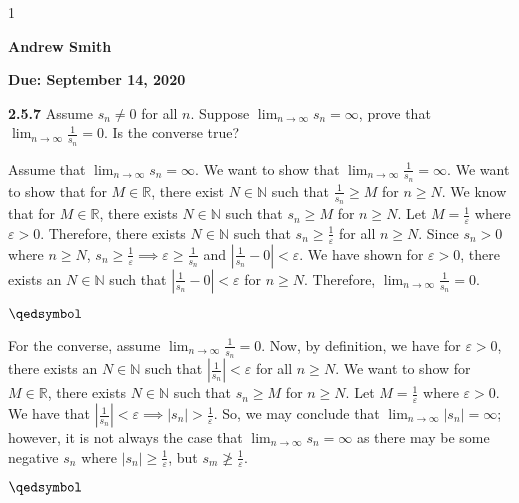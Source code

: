 \documentclass[12pt]{article}
\newcommand{\duedate}{September 14, 2020}
\newcommand{\yourname}{Andrew Smith}
\def\printsolutions{1}
\newcommand{\N}{\mathbb{N}}
\newcommand{\R}{\mathbb{R}}
\begin{document}
\if\printsolutions1
\begin{center}
\textbf{\Large \yourname}
\end{center}
\else
\begin{center}
\textbf{\Large Due: \duedate}
\end{center}
\fi


\begin{problem}\textbf{2.5.7}
Assume $s_n\neq 0$ for all $n$. Suppose ${\lim_{n \to \infty}s_n=\infty}$, prove that ${\lim_{n \to \infty}\frac{1}{s_n}=0}$. Is the converse true?
\end{problem}
\begin{solution}
Assume that ${\lim_{n \to \infty}s_n=\infty}$.\newline
We want to show that ${\lim_{n \to \infty}\frac{1}{s_n}=\infty}$.\newline
We want to show that for $M\in\R$, there exist $N\in\N$ such that $\frac{1}{s_n}\geq M$ for $n\geq N$.\newline
We know that for $M\in\R$, there exists $N\in\N$ such that $s_n\geq M$ for $n\geq N$.\newline
Let $M=\frac{1}{\varepsilon}$ where $\varepsilon>0$.\newline
Therefore, there exists $N\in\N$ such that $s_n\geq \frac{1}{\varepsilon}$ for all $n\geq N$.\newline
Since $s_n>0$ where $n\geq N$, $s_n\geq \frac{1}{\varepsilon}\implies \varepsilon\geq \frac{1}{s_n}$ and $|\frac{1}{s_n}-0|< \varepsilon$.\newline
We have shown for $\varepsilon>0$, there exists an $N\in\N$ such that $|\frac{1}{s_n}-0|< \varepsilon$ for $n\geq N$.\newline
Therefore, $\lim_{n\to\infty}\frac{1}{s_n}=0$.
\begin{flushright}
$\qedsymbol$
\end{flushright}
For the converse, assume $\lim_{n\to\infty}\frac{1}{s_n}=0$.\newline
Now, by definition, we have for $\varepsilon>0$, there exists an $N\in\N$ such that $|\frac{1}{s_n}|< \varepsilon$ for all $n\geq N$.
We want to show for $M\in\R$, there exists $N\in\N$ such that $s_n\geq M$ for $n\geq N$.\newline
Let $M=\frac{1}{\varepsilon}$ where $\varepsilon>0$.\newline
We have that $|\frac{1}{s_n}|<\varepsilon\implies |s_n|> \frac{1}{\varepsilon}$.\newline
So, we may conclude that $\lim_{n\to\infty}|s_n|=\infty$; however, it is not always the case that $\lim_{n\to\infty}s_n=\infty$ as there may be some negative $s_n$ where $|s_n|\geq \frac{1}{\varepsilon}$, but $s_m\ngeq\frac{1}{\varepsilon}$.
\begin{flushright}
$\qedsymbol$
\end{flushright}
\end{solution}
\end{document}
